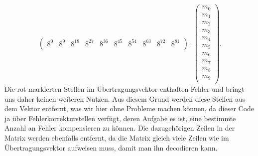 \[\begin{pmatrix}
	8^0&	8^9& 8^{18}& 8^{27}& 8^{36}& 8^{45}& 8^{54}& 8^{63}& 8^{72}& 8^{81}\\
\end{pmatrix}
\cdot
\begin{pmatrix}
	m_0 \\ m_1 \\ m_2 \\ m_3 \\ m_4 \\ m_5 \\ m_6 \\ m_7 \\ m_8 \\ m_9 \\
\end{pmatrix}
.
\]
Die rot markierten Stellen im Übertragungsvektor enthalten Fehler und bringt uns daher keinen weiteren Nutzen. 
Aus diesem Grund werden diese Stellen aus dem Vektor entfernt, was wir hier ohne Probleme machen können, da dieser Code ja über Fehlerkorrekturstellen verfügt, deren Aufgabe es ist, eine bestimmte Anzahl an Fehler kompensieren zu können.
Die dazugehörigen Zeilen in der Matrix werden ebenfalls entfernt, da die Matrix gleich viele Zeilen wie im Übertragungsvektor aufweisen muss, damit man ihn decodieren kann.

